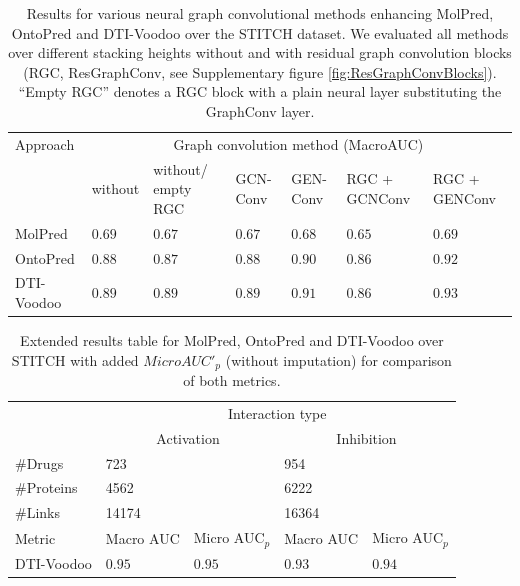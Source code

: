 \documentclass[]{article}
\newcommand{\name}{DTI-Voodoo}
\begin{document}
\clearpage
\begin{table}[ht]
	\centering

	\begin{tabular}{|p{2.0cm}|p{1.1cm}|p{1.2cm}|p{0.8cm}|p{0.8cm}|p{1.2cm}|p{1.2cm}|}
		\hline
		Approach&\multicolumn{6}{c|}{Graph convolution method (MacroAUC)}\\
		&without&without/ empty RGC&GCN-Conv&GEN-Conv&RGC + GCNConv&RGC + GENConv\\
		\hline
		MolPred & $0.69$ & $0.67$& $0.67$& $0.68$& $0.65$& $0.69$\\
		\hline
		OntoPred &$0.88$ &$0.87$ &$0.88$&$0.90$&$0.86$&$0.92$\\
		\hline
		\name& $0.89$&$0.89$& $0.89$& $0.91$& $0.86$& $\mathbf{0.93}$\\
		\hline
	\end{tabular}
	\caption{\label{tab:Results}Results for various neural graph
          convolutional methods enhancing MolPred, OntoPred and
          \name{} over the STITCH dataset. We evaluated all methods
          over different stacking heights without and with residual
          graph convolution blocks (RGC, ResGraphConv, see
          Supplementary figure \ref{fig:ResGraphConvBlocks}). ``Empty
          RGC'' denotes a RGC block with a plain neural layer
          substituting the GraphConv layer.}
\end{table}

\clearpage
\begin{table}[ht]
	\centering
	\begin{tabular}{|p{2.0cm}|p{1cm}|p{1cm}|p{1cm}|p{1cm}|}
		\hline
		&\multicolumn{4}{c|}{Interaction type}\\
		&\multicolumn{2}{c|}{Activation}&\multicolumn{2}{c|}{Inhibition}\\
		\#Drugs & \multicolumn{2}{l|}{723} & \multicolumn{2}{l|}{954}\\
		\#Proteins&\multicolumn{2}{l|}{4562}&\multicolumn{2}{l|}{6222}\\
		\#Links&\multicolumn{2}{l|}{14174}&\multicolumn{2}{l|}{16364}\\
		\hline
		Metric&Macro AUC&Micro AUC$_p$&Macro AUC&Micro AUC$_p$\\
		\name&$0.95$&$0.95$&$0.93$&$0.94$\\
		\hline
		
	\end{tabular}
	\caption{Extended results table for MolPred, OntoPred and
		\name{} over STITCH with added $MicroAUC'_p$ (without
		imputation) for comparison of both metrics.}
\end{table}
\end{document}
